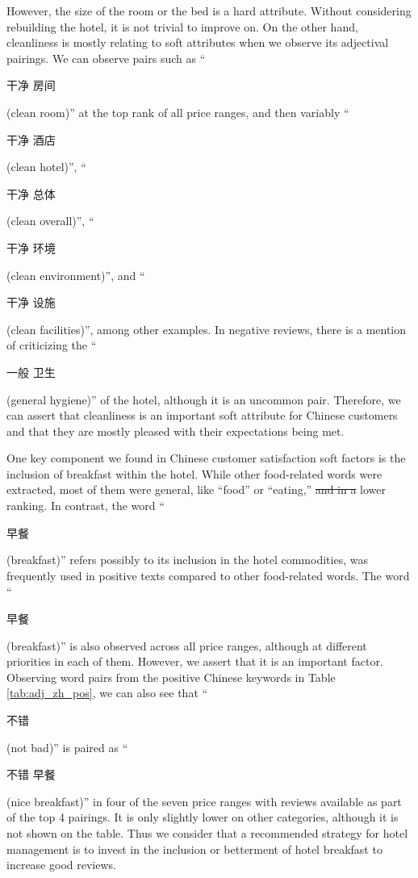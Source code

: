 \documentclass[smallextended,natbib]{svjour3}       %
\providecommand{\DIFadd}[1]{{\protect\color{blue}\uwave{#1}}} %
\providecommand{\DIFdel}[1]{{\protect\color{red}\sout{#1}}}                      %
\providecommand{\DIFaddbegin}{} %
\providecommand{\DIFaddend}{} %
\providecommand{\DIFdelbegin}{} %
\providecommand{\DIFdelend}{} %
\newcommand{\DIFscaledelfig}{0.5}
\newlength{\DIFdelgraphicswidth} %
\newlength{\DIFdelgraphicsheight} %
\newcommand{\DIFaddincludegraphics}[2][]{{\color{blue}\fbox{\DIFOincludegraphics[#1]{#2}}}} %
\newcommand{\DIFdelincludegraphics}[2][]{%
\sbox{\DIFdelgraphicsbox}{\DIFOincludegraphics[#1]{#2}}%
\settoboxwidth{\DIFdelgraphicswidth}{\DIFdelgraphicsbox} %
\settoboxtotalheight{\DIFdelgraphicsheight}{\DIFdelgraphicsbox} %
\scalebox{\DIFscaledelfig}{%
\parbox[b]{\DIFdelgraphicswidth}{\usebox{\DIFdelgraphicsbox}\\[-\baselineskip] \rule{\DIFdelgraphicswidth}{0em}}\llap{\resizebox{\DIFdelgraphicswidth}{\DIFdelgraphicsheight}{%
\setlength{\unitlength}{\DIFdelgraphicswidth}%
\begin{picture}(1,1)%
\thicklines\linethickness{2pt} %
{\color[rgb]{1,0,0}\put(0,0){\framebox(1,1){}}}%
{\color[rgb]{1,0,0}\put(0,0){\line( 1,1){1}}}%
{\color[rgb]{1,0,0}\put(0,1){\line(1,-1){1}}}%
\end{picture}%
}\hspace*{3pt}}} %
} %
\DeclareRobustCommand{\DIFaddbegin}{\DIFOaddbegin \let\includegraphics\DIFaddincludegraphics} %
\DeclareRobustCommand{\DIFaddend}{\DIFOaddend \let\includegraphics\DIFOincludegraphics} %
\DeclareRobustCommand{\DIFdelbegin}{\DIFOdelbegin \let\includegraphics\DIFdelincludegraphics} %
\DeclareRobustCommand{\DIFdelend}{\DIFOaddend \let\includegraphics\DIFOincludegraphics} %
\begin{document}
    However, the size of the room or the bed is a hard attribute. Without considering rebuilding the hotel, it is not trivial to improve on. On the other hand, cleanliness is mostly relating to soft attributes when we observe its adjectival pairings. We can observe pairs such as ``\begin{CJK}{UTF8}{gbsn}干净 房间\end{CJK} (clean room)'' at the top rank of all price ranges, and then variably ``\begin{CJK}{UTF8}{gbsn}干净 酒店\end{CJK} (clean hotel)'', ``\begin{CJK}{UTF8}{gbsn}干净 总体\end{CJK} (clean overall)'', ``\begin{CJK}{UTF8}{gbsn}干净 环境\end{CJK} (clean environment)'', and ``\begin{CJK}{UTF8}{gbsn}干净 设施\end{CJK} (clean facilities)'', among other examples. In negative reviews, there is a mention of criticizing the ``\begin{CJK}{UTF8}{gbsn}一般 卫生\end{CJK} (general hygiene)'' of the hotel, although it is an uncommon pair. Therefore, we can assert that cleanliness is an important soft attribute for Chinese customers and that they are mostly pleased with their expectations being met. 

    One key component we found in Chinese customer satisfaction soft factors is the inclusion of breakfast within the hotel. While other food-related words were extracted, most of them were general, like ``food'' or ``eating,'' \DIFdelbegin \DIFdel{and in a }\DIFdelend \DIFaddbegin \DIFadd{which were }\DIFaddend lower ranking. In contrast, the word ``\begin{CJK}{UTF8}{gbsn}早餐\end{CJK} (breakfast)'' refers possibly to its inclusion in the hotel commodities, was frequently used in positive texts compared to other food-related words. The word ``\begin{CJK}{UTF8}{gbsn}早餐\end{CJK} (breakfast)'' is also observed across all price ranges, although at different priorities in each of them. However, we assert that it is an important factor. Observing word pairs from the positive Chinese keywords in Table \ref{tab:adj_zh_pos}, we can also see that ``\begin{CJK}{UTF8}{gbsn}不错\end{CJK} (not bad)'' is paired as ``\begin{CJK}{UTF8}{gbsn}不错 早餐\end{CJK} (nice breakfast)'' in four of the seven price ranges with reviews available as part of the top 4 pairings. It is only slightly lower on other categories, although it is not shown on the table. Thus we consider that a recommended strategy for hotel management is to invest in the inclusion or betterment of hotel breakfast to increase good reviews.
\end{document}
